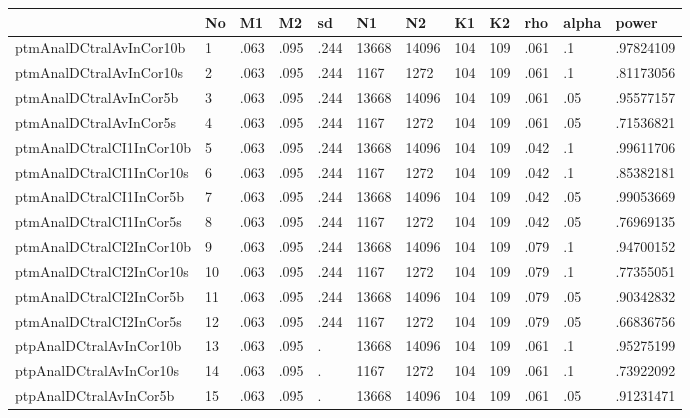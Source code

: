 \begin{table}[htbp]
\begin{tabular}{|l|l|l|l|l|l|l|l|l|l|l|l|}\hline  
 & No  & M1  & M2  & sd  & N1  & N2  & K1  & K2  & rho  & alpha  & power  \\ \hline  
ptmAnalDCtralAvInCor10b & 1 & .063 & .095 & .244 & 13668 & 14096 & 104 & 109 & .061 & .1 & .97824109 \\ \hline 
ptmAnalDCtralAvInCor10s & 2 & .063 & .095 & .244 & 1167 & 1272 & 104 & 109 & .061 & .1 & .81173056 \\ \hline 
ptmAnalDCtralAvInCor5b & 3 & .063 & .095 & .244 & 13668 & 14096 & 104 & 109 & .061 & .05 & .95577157 \\ \hline 
ptmAnalDCtralAvInCor5s & 4 & .063 & .095 & .244 & 1167 & 1272 & 104 & 109 & .061 & .05 & .71536821 \\ \hline 
ptmAnalDCtralCI1InCor10b & 5 & .063 & .095 & .244 & 13668 & 14096 & 104 & 109 & .042 & .1 & .99611706 \\ \hline 
ptmAnalDCtralCI1InCor10s & 6 & .063 & .095 & .244 & 1167 & 1272 & 104 & 109 & .042 & .1 & .85382181 \\ \hline 
ptmAnalDCtralCI1InCor5b & 7 & .063 & .095 & .244 & 13668 & 14096 & 104 & 109 & .042 & .05 & .99053669 \\ \hline 
ptmAnalDCtralCI1InCor5s & 8 & .063 & .095 & .244 & 1167 & 1272 & 104 & 109 & .042 & .05 & .76969135 \\ \hline 
ptmAnalDCtralCI2InCor10b & 9 & .063 & .095 & .244 & 13668 & 14096 & 104 & 109 & .079 & .1 & .94700152 \\ \hline 
ptmAnalDCtralCI2InCor10s & 10 & .063 & .095 & .244 & 1167 & 1272 & 104 & 109 & .079 & .1 & .77355051 \\ \hline 
ptmAnalDCtralCI2InCor5b & 11 & .063 & .095 & .244 & 13668 & 14096 & 104 & 109 & .079 & .05 & .90342832 \\ \hline 
ptmAnalDCtralCI2InCor5s & 12 & .063 & .095 & .244 & 1167 & 1272 & 104 & 109 & .079 & .05 & .66836756 \\ \hline 
ptpAnalDCtralAvInCor10b & 13 & .063 & .095 & . & 13668 & 14096 & 104 & 109 & .061 & .1 & .95275199 \\ \hline 
ptpAnalDCtralAvInCor10s & 14 & .063 & .095 & . & 1167 & 1272 & 104 & 109 & .061 & .1 & .73922092 \\ \hline 
ptpAnalDCtralAvInCor5b & 15 & .063 & .095 & . & 13668 & 14096 & 104 & 109 & .061 & .05 & .91231471 \\ \hline 

\end{tabular}
\end{table}
